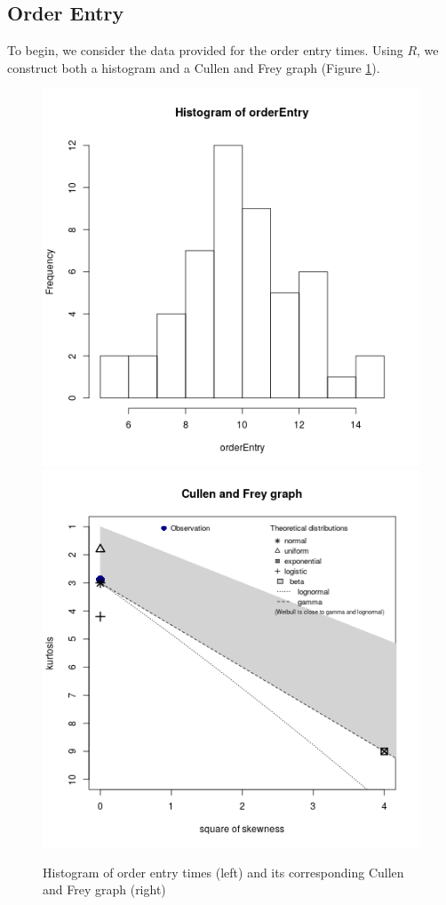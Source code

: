 \documentclass[10pt]{report}            %
\begin{document}
\subsection*{Order Entry}
To begin, we consider the data provided for the order entry times. Using $R$, we construct both a histogram and a Cullen and Frey graph (Figure \ref{fig:orderEntryHistCullen}).
\begin{figure}[H]
\centering
\includegraphics[scale=.35]{OrderEntryHist.png}
\includegraphics[scale=.35]{OrderEntryCullen.png}
\caption{Histogram of order entry times (left) and its corresponding Cullen and Frey graph (right)}
\label{fig:orderEntryHistCullen}
\end{figure}
\end{document}

